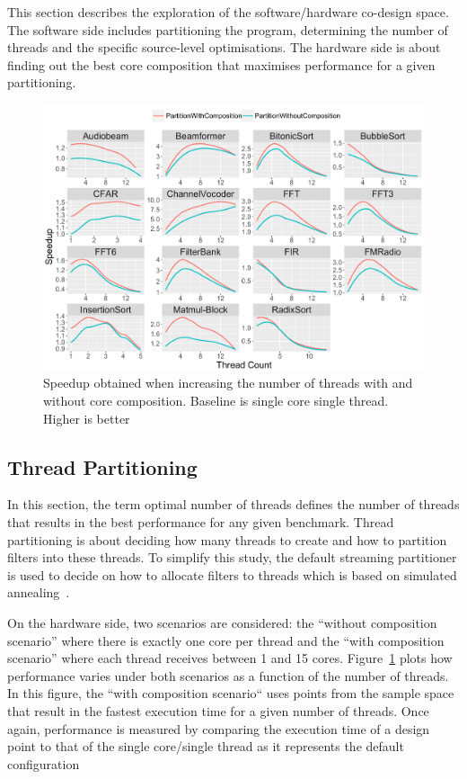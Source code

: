 This section describes the exploration of the software/hardware co-design space.
The software side includes partitioning the program, determining the number of threads and the specific source-level optimisations.
The hardware side is about finding out the best core composition that maximises performance for a given partitioning.

\begin{figure}[t]
 \centering
    \includegraphics[width=1\textwidth]{streamit-paper/graphics/threadingmaybe5.pdf}
    \caption{Speedup obtained when increasing the number of threads with and without core composition. Baseline is single core single thread. Higher is better}\label{fig:threadtrend}  \vspace{-1em}

\end{figure}

\subsection{Thread Partitioning}

In this section, the term optimal number of threads defines the number of threads that results in the best performance for any given benchmark.
Thread partitioning is about deciding how many threads to create and how to partition filters into these threads.
To simplify this study, the default streaming partitioner is used to decide on how to allocate filters to threads which is based on simulated annealing~\cite{simulatedAnnealing1983}.

On the hardware side, two scenarios are considered: the ``without composition scenario'' where there is exactly one core per thread and the ``with composition scenario'' where each thread receives between 1 and 15 cores.
Figure~\ref{fig:threadtrend} plots how performance varies under both scenarios as a function of the number of threads.
In this figure, the ``with composition scenario`` uses points from the sample space that result in the fastest execution time for a given number of threads.
Once again, performance is measured by comparing the execution time of a design point to that of the single core/single thread as it represents the default configuration

